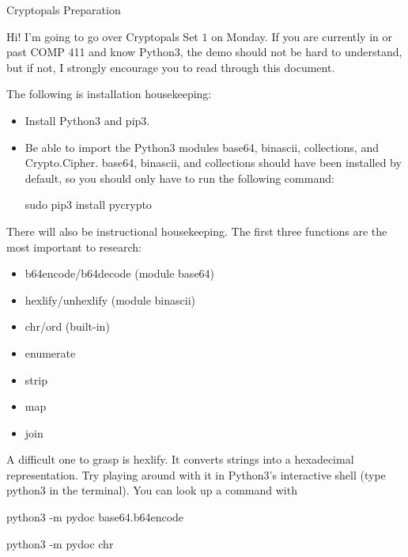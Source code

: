 \documentclass{article}
\begin{document}
\centerline{\sc \large Cryptopals Preparation}

\vspace{1pc}

Hi! I'm going to go over Cryptopals Set $1$ on Monday. If you are currently in or past COMP 411 and know Python3, the demo should not be hard to understand, but if not, I strongly encourage you to read through this document.

\vspace{1pc}

The following is installation housekeeping:

\begin{itemize}
	\item Install Python3 and pip3.
	\item Be able to import the Python3 modules base64, binascii, collections, and Crypto.Cipher. base64, binascii, and collections should have been installed by default, so you should only have to run the following command:
		\begin{center}
			sudo pip3 install pycrypto
		\end{center}
\end{itemize}

\vspace{1pc}

There will also be instructional housekeeping. The first three functions are the most important to research:
\begin{itemize}
	\item b64encode/b64decode (module base64)
	\item hexlify/unhexlify (module binascii)
	\item chr/ord (built-in)
	\item enumerate
	\item strip
	\item map
	\item join
\end{itemize}

A difficult one to grasp is hexlify. It converts strings into a hexadecimal representation. Try playing around with it in Python3's interactive shell (type python3 in the terminal). You can look up a command with
\begin{center}
	python3 -m pydoc base64.b64encode
	
	python3 -m pydoc chr
\end{center}

\vspace{1pc}
\end{document}
